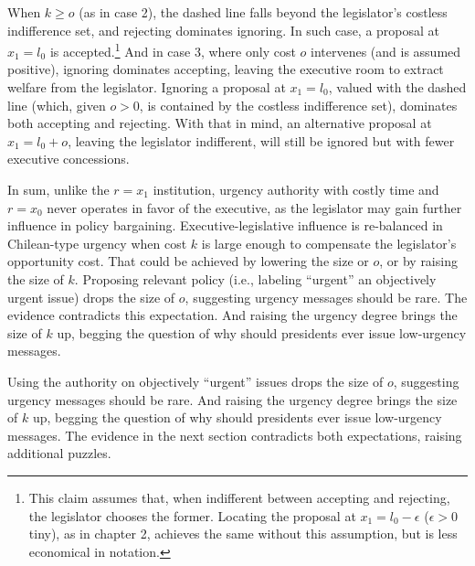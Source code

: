 \documentclass[letter,12pt]{article}
\begin{document}
When $k\geq o$ (as in case 2), the dashed line falls beyond the legislator's costless indifference set, and rejecting dominates ignoring. In such case, a proposal at $x_1=l_0$ is accepted.\footnote{This claim assumes that, when indifferent between accepting and rejecting, the legislator chooses the former. Locating the proposal at $x_1=l_0-\epsilon$ ($\epsilon>0$ tiny), as in chapter 2, achieves the same without this assumption, but is less economical in notation.} And in case 3, where only cost $o$ intervenes (and is assumed positive), ignoring dominates accepting, leaving the executive room to extract welfare from the legislator. Ignoring a proposal at $x_1=l_0$, valued with the dashed line (which, given $o>0$, is contained by the costless indifference set), dominates both accepting and rejecting. With that in mind, an alternative proposal at $x_1=l_0+o$, leaving the legislator indifferent, will still be ignored but with fewer executive concessions. 

In sum, unlike the $r=x_1$ institution, urgency authority with costly time and $r=x_0$ never operates in favor of the executive, as the legislator may gain further influence in policy bargaining. Executive-legislative influence is re-balanced in Chilean-type urgency when cost $k$ is large enough to compensate the legislator's opportunity cost. That could be achieved by lowering the size or $o$, or by raising the size of $k$. Proposing relevant policy (i.e., labeling ``urgent'' an objectively urgent issue) drops the size of $o$, suggesting urgency messages should be rare. The evidence contradicts this expectation. And raising the urgency degree brings the size of $k$ up, begging the question of why should presidents ever issue low-urgency messages.  

Using the authority on objectively ``urgent'' issues drops the size of $o$, suggesting urgency messages should be rare. And raising the urgency degree brings the size of $k$ up, begging the question of why should presidents ever issue low-urgency messages. The evidence in the next section contradicts both expectations, raising additional puzzles. 

\end{document}
